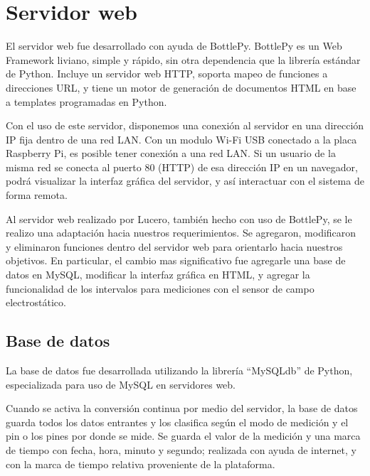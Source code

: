 
\section{Servidor web} %
\label{it7:sec:servidor_web}

El servidor web fue desarrollado con ayuda de BottlePy. BottlePy es un Web Framework liviano, simple y rápido, sin otra dependencia que la librería estándar de Python. Incluye un servidor web HTTP, soporta mapeo de funciones a direcciones URL, y tiene un motor de generación de documentos HTML en base a templates programadas en Python.

Con el uso de este servidor, disponemos una conexión al servidor en una dirección IP fija dentro de una red LAN. Con un modulo Wi-Fi USB conectado a la placa Raspberry Pi, es posible tener conexión a una red LAN. Si un usuario de la misma red se conecta al puerto 80 (HTTP) de esa dirección IP en un navegador, podrá visualizar la interfaz gráfica del servidor, y así interactuar con el sistema de forma remota.

Al servidor web realizado por Lucero, también hecho con uso de BottlePy, se le realizo una adaptación hacia nuestros requerimientos. Se agregaron, modificaron y eliminaron funciones dentro del servidor web para orientarlo hacia nuestros objetivos. En particular, el cambio mas significativo fue agregarle una base de datos en MySQL, modificar la interfaz gráfica en HTML, y agregar la funcionalidad de los intervalos para mediciones con el sensor de campo electrostático.


\subsection{Base de datos} %
\label{it7:sub:base_de_datos}

La base de datos fue desarrollada utilizando la librería ``MySQLdb'' de Python, especializada para uso de MySQL en servidores web.

Cuando se activa la conversión continua por medio del servidor, la base de datos guarda todos los datos entrantes y los clasifica según el modo de medición y el pin o los pines por donde se mide. Se guarda el valor de la medición y una marca de tiempo con fecha, hora, minuto y segundo; realizada con ayuda de internet, y con la marca de tiempo relativa proveniente de la plataforma.

